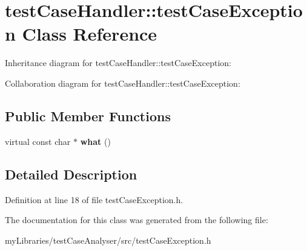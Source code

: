 \hypertarget{classtestCaseHandler_1_1testCaseException}{}\section{test\+Case\+Handler\+::test\+Case\+Exception Class Reference}
\label{classtestCaseHandler_1_1testCaseException}


Inheritance diagram for test\+Case\+Handler\+::test\+Case\+Exception\+:


Collaboration diagram for test\+Case\+Handler\+::test\+Case\+Exception\+:
\subsection*{Public Member Functions}
\begin{DoxyCompactItemize}
\item 
\mbox{\label{classtestCaseHandler_1_1testCaseException_a9b8b1aebb4b65c1563640c235b45abc5}} 
virtual const char $\ast$ {\bfseries what} ()
\end{DoxyCompactItemize}


\subsection{Detailed Description}


Definition at line 18 of file test\+Case\+Exception.\+h.



The documentation for this class was generated from the following file\+:\begin{DoxyCompactItemize}
\item 
my\+Libraries/test\+Case\+Analyser/src/test\+Case\+Exception.\+h\end{DoxyCompactItemize}
